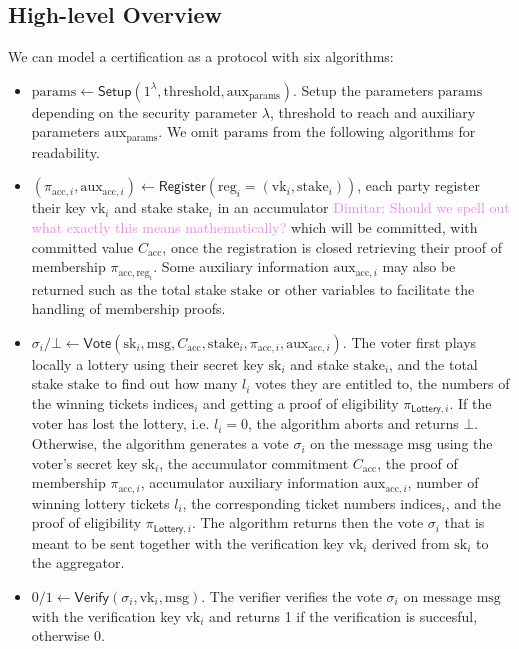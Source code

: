 \documentclass{article}
\newcommand{\vk}[1]{\ensuremath{\textrm{vk}_{#1}}\xspace}
\newcommand{\sk}[1]{\ensuremath{\textrm{sk}_{#1}}\xspace}
\newcommand{\m}{\ensuremath{\textrm{msg}}\xspace}
\newcommand{\acc}{\ensuremath{\textrm{acc}}\xspace}
\newcommand{\aux}{\ensuremath{\textrm{aux}}\xspace}
\newcommand{\pp}{\ensuremath{\textrm{params}}\xspace}
\newcommand{\reg}[1]{\ensuremath{\textrm{reg}_{#1}}\xspace}
\newcommand{\stake}[1]{\ensuremath{\textrm{stake}_{#1}}\xspace}
\newcommand{\indices}[1]{\ensuremath{\textrm{indices}_{#1}}\xspace}
\newcommand{\Lottery}{\ensuremath{\mathsf{Lottery}}\xspace}
\newcommand{\Vote}{\ensuremath{\mathsf{Vote}}\xspace}
\newcommand{\Verify}{\ensuremath{\mathsf{Verify}}\xspace}
\newcommand{\Setup}{\ensuremath{\mathsf{Setup}}\xspace}
\newcommand{\Register}{\ensuremath{\mathsf{Register}}\xspace}
\newcommand{\dimitar}[1]{\textcolor{violet}{Dimitar: #1}\xspace}
\begin{document}
%
%
\subsection{High-level Overview}

We can model a certification as a protocol with six algorithms:
\begin{itemize}
    \item $\pp \leftarrow \Setup(1^\lambda, \text{threshold}, \aux_\pp)$.
    Setup the parameters \pp depending on the security parameter $\lambda$, threshold to reach and auxiliary parameters $\aux_\pp$. We omit \pp from the following algorithms for readability.
    \item $(\pi_{\acc,i}, \aux_{\acc,i}) \leftarrow \Register(\reg{i}=(\vk{i}, \stake{i}))$, each party register their key $\vk{i}$ and stake $\stake{i}$ in an accumulator \dimitar{Should we spell out what exactly this means mathematically?} which will be committed, with committed value $C_\acc$, once the registration is closed retrieving their proof of membership $\pi_{\acc, \reg{i}}$. Some auxiliary information $\aux_{\acc, i}$ may also be returned such as the total stake $\stake{}$ or other variables to facilitate the handling of membership proofs.
    
    \item $\sigma_i / \bot \leftarrow \Vote(\sk{i}, \m, C_\acc, \stake{i}, \pi_{\acc,i}, \aux_{\acc,i})$.
    The voter first plays locally a lottery using their secret key \sk{i} and stake \stake{i}, and the total stake \stake{} to find out how many $l_i$ votes they are entitled to, the numbers of the winning tickets $\indices{i}$ and getting a proof of eligibility $\pi_{\Lottery, i}$. 
    If the voter has lost the lottery, i.e. $l_i = 0$, the algorithm aborts and returns $\bot$.
    Otherwise, the algorithm generates a vote $\sigma_i$ on the message \m using the voter's secret key \sk{i}, the accumulator commitment $C_\acc$, the proof of membership $ \pi_{\acc,i}$, accumulator auxiliary information $\aux_{\acc,i}$, number of winning lottery tickets $l_i$, the corresponding ticket numbers $\indices{i}$, and the proof of eligibility $\pi_{\Lottery, i}$.
    The algorithm returns then the vote $\sigma_i$ that is meant to be sent together with the verification key \vk{i} derived from \sk{i} to the aggregator.

    \item $0/1 \leftarrow \Verify(\sigma_i, \vk{i}, \m)$.
    The verifier verifies the vote $\sigma_{i}$ on message \m with the verification key $\vk{i}$ and returns 1 if the verification is succesful, otherwise 0.
    

\end{itemize}
\end{document}
